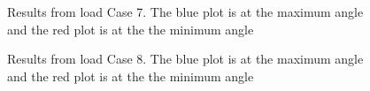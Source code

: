 \begin{figure}[H]
\hfill
{}\hfill
\caption[$\; \:$Results from load Case 7]{Results from load Case 7. The blue plot is at the maximum angle and the red plot is at the the minimum angle}
\label{fig:r7}
\end{figure}

\begin{figure}[H]
\hfill
{}\hfill
\caption[$\; \:$Results from load Case 8]{Results from load Case 8. The blue plot is at the maximum angle and the red plot is at the the minimum angle}
\label{fig:r8}
\end{figure}

